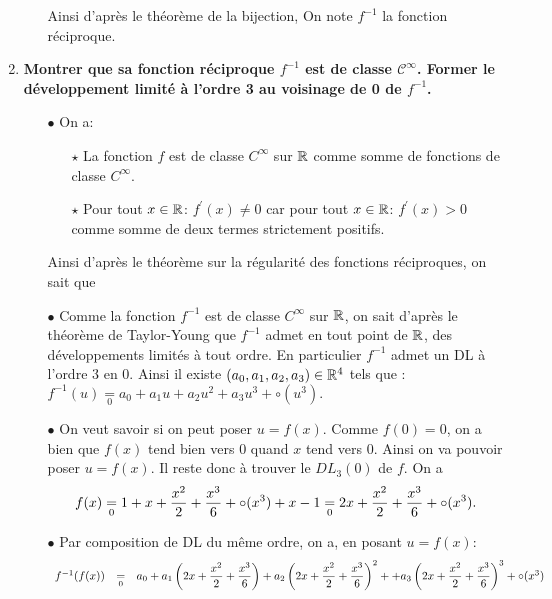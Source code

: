 \documentclass[a4paper, 11pt,reqno]{article}
\begin{document}
\begin{correction}
\begin{enumerate}
\begin{itemize}
\begin{itemize}
			            \end{itemize}
			            Ainsi d'apr\`{e}s le th\'eor\`{e}me de la bijection,  On note $f^{-1}$ la fonction r\'eciproque.
		      \end{itemize}
		\item \textbf{Montrer que sa fonction r\'eciproque $f^{-1}$ est de classe $\mathcal{C}^{\infty}$. Former le d\'eveloppement limit\'e \`a l'ordre 3 au voisinage de 0 de $f^{-1}$.}
		      \begin{itemize}
			      \item[$\bullet$] On a:
			            \begin{itemize}
				            \item[$\star$] La fonction $f$ est de classe $C^{\infty}$ sur $\R$ comme somme de fonctions de classe $C^{\infty}$.
				            \item[$\star$] Pour tout $x\in\R$: $f^{\prime}(x)\not= 0$ car pour  tout $x\in\R$: $f^{\prime}(x)> 0$ comme somme de deux termes strictement positifs.
			            \end{itemize}
			            Ainsi d'apr\`{e}s le th\'eor\`{e}me sur la r\'egularit\'e des fonctions r\'eciproques, on sait que 
			      \item[$\bullet$] Comme la fonction $f^{-1}$ est de classe $C^{\infty}$ sur $\R$, on sait d'apr\`{e}s le th\'eor\`{e}me de Taylor-Young que $f^{-1}$ admet en tout point de $\R$, des d\'eveloppements limit\'es \`a tout ordre. En particulier
			            $f^{-1}$ admet un DL \`{a} l'ordre 3 en 0. Ainsi il existe $(a_0,a_1,a_2,a_3)\in\R^4$ tels que : $f^{-1}(u)\underset{0}{=} a_0+a_1 u+a_2 u^2+a_3u^3 +\circ(u^3).$
			      \item[$\bullet$] On veut savoir si on peut poser $u=f(x)$. Comme $f(0)=0$, on a bien que $f(x)$ tend bien vers 0 quand $x$ tend vers 0. Ainsi on va pouvoir poser $u=f(x)$. Il reste donc \`{a} trouver le $DL_3(0)$ de $f$. On a
			            $$f(x)\underset{0}{=}1+x+\ddp\frac{x^2}{2}+\ddp\frac{x^3}{6}+\circ(x^3)+x-1\underset{0}{=} 2x+\ddp\frac{x^2}{2}+\ddp\frac{x^3}{6}+\circ(x^3).$$
			      \item[$\bullet$] Par composition de DL du m\^{e}me ordre, on a, en posant $u=f(x)$:
			            $$\begin{array}{lll}
					            f^{-1}(f(x)) & \underset{0}{=} & a_0+a_1\left( 2x+\ddp\frac{x^2}{2}+\ddp\frac{x^3}{6}\right)+a_2\left(2x+\ddp\frac{x^2}{2}+\ddp\frac{x^3}{6}\right)^2++a_3\left(2x+\ddp\frac{x^2}{2}+\ddp\frac{x^3}{6}\right)^3+\circ(x^3)\vsec \\

\end{array}$$
\end{itemize}
\end{enumerate}
\end{correction}
\end{document}
